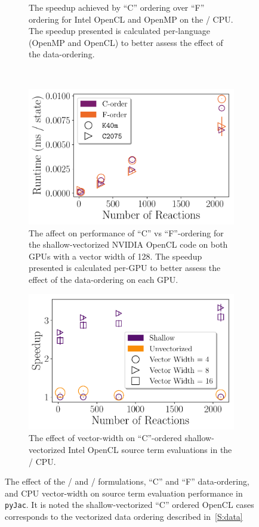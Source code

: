 \documentclass[12pt,number,sort&compress,preprint]{elsarticle}
\begin{document}
\begin{figure}[htbp]
\begin{subfigure}[t]{0.48\linewidth}
      \caption{The speedup achieved by ``C'' ordering over ``F'' ordering for Intel OpenCL and OpenMP on the \avx/ CPU.  The speedup presented is calculated per-language (OpenMP and OpenCL) to better assess the effect of the data-ordering.}
      \label{F:source_cvsf}
  \end{subfigure}
  \\
  \begin{subfigure}[t]{0.48\linewidth}
      \includegraphics[width=\textwidth]{source_gpu_cvsf.pdf}
      \caption{The affect on performance of ``C'' vs ``F''-ordering for the shallow-vectorized NVIDIA OpenCL code on both GPUs with a vector width of 128.  The speedup presented is calculated per-GPU to better assess the effect of the data-ordering on each GPU.}
      \label{F:source_gpu_cvsf}
  \end{subfigure}
  \hfill
  \begin{subfigure}[t]{0.48\linewidth}
      \includegraphics[width=\textwidth]{source_vector_width.pdf}
      \caption{The effect of vector-width on ``C''-ordered shallow-vectorized Intel OpenCL source term evaluations in the \avx/ CPU.}
      \label{F:source_vector_width}
  \end{subfigure}
  \caption{The effect of the \conp/ and \conv/ formulations, ``C'' and ``F'' data-ordering, and CPU vector-width on source term evaluation performance in \texttt{pyJac}.
	   It is noted the shallow-vectorized ``C'' ordered OpenCL cases corresponds to the vectorized data ordering described in~\cref{S:data}}
  \label{f:source_permutate}
\end{figure}
\end{document}
